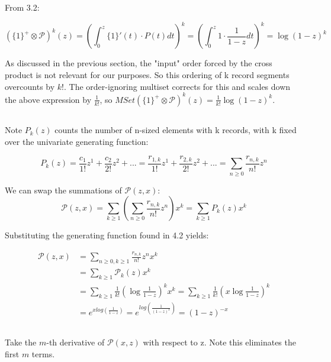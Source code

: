 \documentclass{article}
\begin{document}
\subsection{} 

From 3.2:

$$(\{1\}^+\otimes \mathcal{P})^k(z) = \left(\int_{0}^{z} \{1\}'(t) \cdot P(t) dt\right)^k = \left(\int_{0}^{z} 1 \cdot \frac{1}{1-z}  dt\right)^k = \log(1-z)^k $$ 

As discussed in the previous section, the "input" order forced by the cross product is not relevant for our purposes. So this ordering of k record segments overcounts by $k!$. The order-ignoring multiset corrects for this and scales down the above expression by $\frac{1}{k!}$, so $MSet(\{1\}^+\otimes \mathcal{P})^k(z) = \frac{1}{k!}\log(1-z)^k$.

\subsection{}

Note $P_k(z)$ counts the number of n-sized elements with k records, with k fixed over the univariate generating function: 

$$P_k(z) =  \frac{c_1}{1!}z^1 + \frac{c_2}{2!}z^2 +... = \frac{r_{1,k}}{1!}z^1 + \frac{r_{2,k}}{2!}z^2 +... = \sum_{n\ge 0} \frac{r_{n,k}}{n!}z^n$$

We can swap the summations of $\mathcal{P}(z,x)$:
$$\mathcal{P}(z,x) =\sum_{k\ge 1}\left( \sum_{n\ge 0} \frac{r_{n,k}}{n!}z^n\right) x^k = \sum_{k\ge 1} P_k(z) x^k $$

Substituting the generating function found in 4.2 yields:

\begin{align*}
	\mathcal{P}(z,x)&=\sum_{n\ge 0, k\ge 1}\frac{r_{n,k}}{n!}z^nx^k\\
	&=\sum_{k\ge 1}\mathcal{P}_k(z) x^k\\
	&=\sum_{k\ge 1}\frac{1}{k!}\left(\log\frac{1}{1-z}\right)^kx^k=\sum_{k\ge 1}\frac{1}{k!}\left(x\log\frac{1}{1-z}\right)^k\\
	&=e^{xlog(\frac{1}{1-z})} = e^{log(\frac{1}{(1-z)^x})} = (1-z)^{-x}
\end{align*}

\subsection{}
Take the $m$-th derivative of $\mathcal P(x,z)$ with respect to z. Note this eliminates the first $m$ terms.
\end{document}
